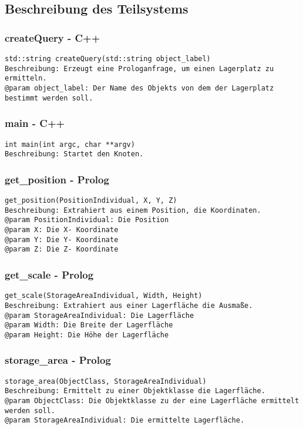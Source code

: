 \documentclass{suturo}
\begin{document}
\subsection{Beschreibung des Teilsystems}

\subsubsection{createQuery - C++}
\begin{verbatim}
std::string createQuery(std::string object_label)
Beschreibung: Erzeugt eine Prologanfrage, um einen Lagerplatz zu ermitteln.
@param object_label: Der Name des Objekts von dem der Lagerplatz bestimmt werden soll.
\end{verbatim}\label{func:segmentplanes}

\subsubsection{main - C++}
\begin{verbatim}
int main(int argc, char **argv)
Beschreibung: Startet den Knoten.
\end{verbatim}\label{func:findcentergazebo}


\subsubsection{get\_position - Prolog}
\begin{verbatim}
get_position(PositionIndividual, X, Y, Z)
Beschreibung: Extrahiert aus einem Position, die Koordinaten.
@param PositionIndividual: Die Position
@param X: Die X- Koordinate
@param Y: Die Y- Koordinate
@param Z: Die Z- Koordinate
\end{verbatim}\label{func:findposes}

\subsubsection{get\_scale - Prolog}
\begin{verbatim}
get_scale(StorageAreaIndividual, Width, Height)
Beschreibung: Extrahiert aus einer Lagerfläche die Ausmaße.
@param StorageAreaIndividual: Die Lagerfläche
@param Width: Die Breite der Lagerfläche
@param Height: Die Höhe der Lagerfläche
\end{verbatim}\label{func:estimatesurfacenormals}

\subsubsection{storage\_area - Prolog}
\begin{verbatim}
storage_area(ObjectClass, StorageAreaIndividual)
Beschreibung: Ermittelt zu einer Objektklasse die Lagerfläche.
@param ObjectClass: Die Objektklasse zu der eine Lagerfläche ermittelt werden soll.
@param StorageAreaIndividual: Die ermittelte Lagerfläche.
\end{verbatim}\label{func:apply3dfilter}
\end{document}
